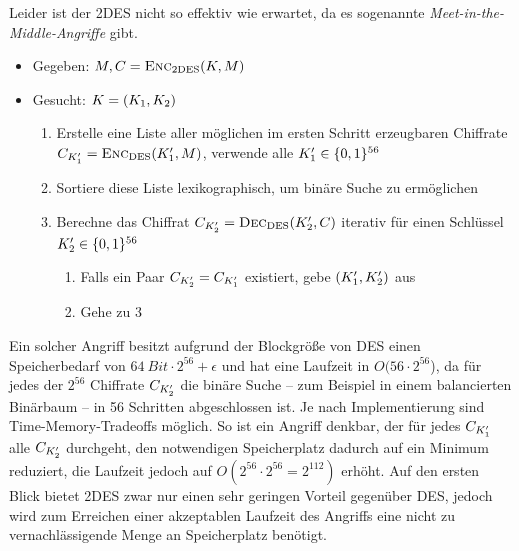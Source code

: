 Leider ist der 2DES nicht so effektiv wie erwartet, da es sogenannte \emph{Meet-in-the-Middle-Angriffe} \indexMeetInTheMiddle gibt.
\begin{itemize}
	\item Gegeben: $M, C = \textsc{Enc}_{\textnormal{2DES}}(K, M)$
	\item Gesucht: $K = (K_{1},K_{2})$
	\begin{enumerate}
		\item Erstelle eine Liste aller möglichen im ersten Schritt erzeugbaren Chiffrate $C_{K'_{1}} = \textsc{Enc}_{\textnormal{DES}}(K'_{1}, M)$, \dh verwende alle $K'_{1} \in \{0,1\}^{56}$
		\item Sortiere diese Liste lexikographisch, um binäre Suche zu ermöglichen
		\item Berechne das Chiffrat $C_{K'_{2}} = \textsc{Dec}_{\textnormal{DES}}(K'_{2}, C)$ iterativ für einen Schlüssel $K'_{2} \in \{0,1\}^{56}$
		\begin{enumerate}
			\item Falls ein Paar $C_{K'_2} = C_{K'_{1}}$ existiert, gebe $(K'_{1},K'_{2})$ aus
			\item Gehe zu 3
		\end{enumerate}
	\end{enumerate}
\end{itemize}

Ein solcher Angriff besitzt aufgrund der Blockgröße von DES einen Speicherbedarf von $64\ Bit \cdot 2^{56} + \epsilon$ und hat eine Laufzeit in $O(56 \cdot 2^{56}$), da für jedes der $2^{56}$ Chiffrate $C_{K'_2}$ die binäre Suche -- zum Beispiel in einem balancierten Binärbaum -- in 56 Schritten abgeschlossen ist. Je nach Implementierung sind Time-Memory-Tradeoffs möglich. So ist ein Angriff denkbar, der für jedes $C_{K'_1}$ alle $C_{K'_2}$ durchgeht, den notwendigen Speicherplatz dadurch auf ein Minimum reduziert, die Laufzeit jedoch auf $O(2^{56} \cdot 2^{56} = 2^{112})$ erhöht. Auf den ersten Blick bietet 2DES zwar nur einen sehr geringen Vorteil gegenüber DES, jedoch wird zum Erreichen einer akzeptablen Laufzeit des Angriffs eine nicht zu vernachlässigende Menge an Speicherplatz benötigt.

